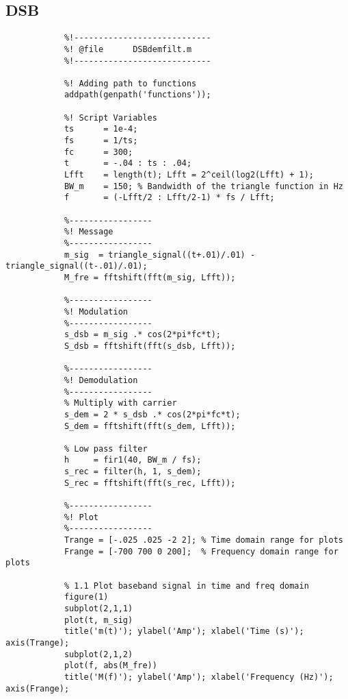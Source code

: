 \documentclass{article}
\begin{document}
    \subsection{DSB}
        \begin{verbatim}
            %!----------------------------
            %! @file      DSBdemfilt.m
            %!----------------------------
            
            %! Adding path to functions
            addpath(genpath('functions'));
            
            %! Script Variables
            ts      = 1e-4;
            fs      = 1/ts;
            fc      = 300;
            t       = -.04 : ts : .04;
            Lfft    = length(t); Lfft = 2^ceil(log2(Lfft) + 1);
            BW_m    = 150; % Bandwidth of the triangle function in Hz
            f       = (-Lfft/2 : Lfft/2-1) * fs / Lfft;
            
            %-----------------
            %! Message
            %-----------------
            m_sig  = triangle_signal((t+.01)/.01) - triangle_signal((t-.01)/.01);
            M_fre = fftshift(fft(m_sig, Lfft));
            
            %-----------------
            %! Modulation
            %-----------------
            s_dsb = m_sig .* cos(2*pi*fc*t);
            S_dsb = fftshift(fft(s_dsb, Lfft));
            
            %-----------------
            %! Demodulation
            %-----------------
            % Multiply with carrier
            s_dem = 2 * s_dsb .* cos(2*pi*fc*t);
            S_dem = fftshift(fft(s_dem, Lfft));
            
            % Low pass filter
            h     = fir1(40, BW_m / fs);
            s_rec = filter(h, 1, s_dem);
            S_rec = fftshift(fft(s_rec, Lfft));
            
            %-----------------
            %! Plot
            %-----------------
            Trange = [-.025 .025 -2 2]; % Time domain range for plots
            Frange = [-700 700 0 200];  % Frequency domain range for plots
            
            % 1.1 Plot baseband signal in time and freq domain
            figure(1)
            subplot(2,1,1)
            plot(t, m_sig)
            title('m(t)'); ylabel('Amp'); xlabel('Time (s)'); axis(Trange);
            subplot(2,1,2)
            plot(f, abs(M_fre))
            title('M(f)'); ylabel('Amp'); xlabel('Frequency (Hz)'); axis(Frange);
            

\end{verbatim}
\end{document}
